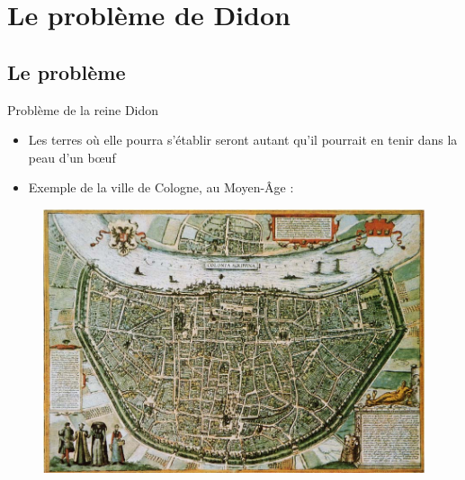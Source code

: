 \documentclass[11pt,envcountsect,aspectratio=169]{beamer} %
\begin{document}
\section{Le problème de Didon}


\subsection{Le problème}


\begin{frame}{Problème de la reine Didon}

	\begin{itemize}
		\item Les terres où elle pourra s'établir seront \og autant qu'il pourrait en tenir dans la peau d'un b\oe{}uf\fg{}
		\item Exemple de la ville de Cologne, au Moyen-Âge :
	\end{itemize}
	
	\begin{figure}
		\includegraphics[scale=0.6]{img/cologne.jpg}
	\end{figure}

\end{frame}
\end{document}

